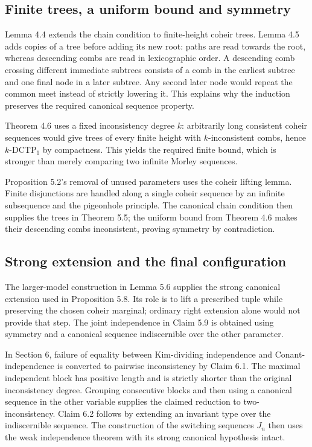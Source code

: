 \documentclass[10pt]{article}
\begin{document}
\subsection*{Finite trees, a uniform bound and symmetry}
Lemma 4.4 extends the chain condition to finite-height coheir trees. Lemma 4.5 adds copies of a tree before adding its new root: paths are read towards the root, whereas descending combs are read in lexicographic order. A descending comb crossing different immediate subtrees consists of a comb in the earliest subtree and one final node in a later subtree. Any second later node would repeat the common meet instead of strictly lowering it. This explains why the induction preserves the required canonical sequence property.\par
Theorem 4.6 uses a fixed inconsistency degree \(k\): arbitrarily long consistent coheir sequences would give trees of every finite height with \(k\)-inconsistent combs, hence \(k\)-\(\mathrm{DCTP}_1\) by compactness. This yields the required finite bound, which is stronger than merely comparing two infinite Morley sequences.\par
Proposition 5.2’s removal of unused parameters uses the coheir lifting lemma. Finite disjunctions are handled along a single coheir sequence by an infinite subsequence and the pigeonhole principle. The canonical chain condition then supplies the trees in Theorem 5.5; the uniform bound from Theorem 4.6 makes their descending combs inconsistent, proving symmetry by contradiction.\par
\subsection*{Strong extension and the final configuration}
The larger-model construction in Lemma 5.6 supplies the strong canonical extension used in Proposition 5.8. Its role is to lift a prescribed tuple while preserving the chosen coheir marginal; ordinary right extension alone would not provide that step. The joint independence in Claim 5.9 is obtained using symmetry and a canonical sequence indiscernible over the other parameter.\par
In Section 6, failure of equality between Kim-dividing independence and Conant-independence is converted to pairwise inconsistency by Claim 6.1. The maximal independent block has positive length and is strictly shorter than the original inconsistency degree. Grouping consecutive blocks and then using a canonical sequence in the other variable supplies the claimed reduction to two-inconsistency. Claim 6.2 follows by extending an invariant type over the indiscernible sequence. The construction of the switching sequences \(J_n\) then uses the weak independence theorem with its strong canonical hypothesis intact.\par
\end{document}
